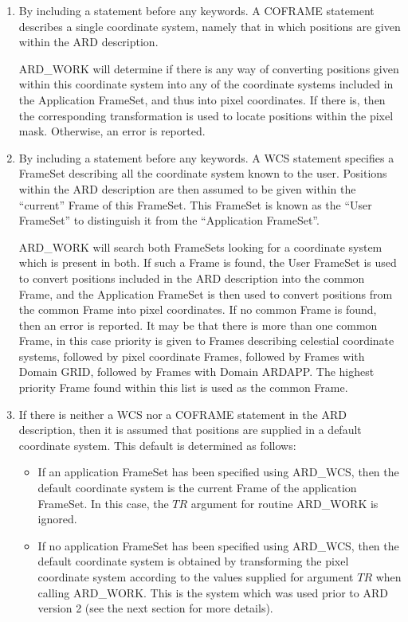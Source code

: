 \begin{enumerate}
\item By including a  statement before any
keywords. A COFRAME statement describes a single coordinate system,
namely that in which positions are given within the ARD description.

ARD\_WORK will determine if there is any way of converting positions
given within this coordinate system into any of the coordinate systems
included in the Application FrameSet, and thus into pixel coordinates.
If there is, then the corresponding transformation is used to locate
positions within the pixel mask. Otherwise, an error is reported.

\item By including a  statement before any
keywords. A WCS statement specifies a FrameSet describing all the
coordinate system known to the user. Positions within the ARD description
are then assumed to be given within the ``current'' Frame of this
FrameSet. This FrameSet is known as the ``User FrameSet'' to distinguish
it from the ``Application FrameSet''.

ARD\_WORK will search both FrameSets looking for a coordinate system
which is present in both. If such a Frame is found, the User FrameSet is
used to convert positions included in the ARD description into the common
Frame, and the Application FrameSet is then used to convert positions
from the common Frame into pixel coordinates. If no common Frame is
found, then an error is reported. It may be that there is more than one
common Frame, in this case priority is given to Frames describing
celestial coordinate systems, followed by pixel coordinate Frames,
followed by Frames with Domain GRID, followed by Frames with Domain
ARDAPP. The highest priority Frame found within this list is used as the
common Frame.

\item If there is neither a WCS nor a COFRAME statement in the ARD
description, then it is assumed that positions are supplied in a default
coordinate system. This default is determined as follows:

\begin{itemize}
\item If an application FrameSet has been specified using ARD\_WCS, then 
the default coordinate system is the current Frame of the application 
FrameSet. In this case, the $TR$ argument for routine ARD\_WORK is ignored.

\item If no application FrameSet has been specified using ARD\_WCS, then 
the default coordinate system is obtained by transforming the pixel
coordinate system according to the values supplied for argument $TR$ when
calling ARD\_WORK. This is the system which was used prior to ARD version
2 (see the next section for more details).
\end{itemize}


\end{enumerate}
